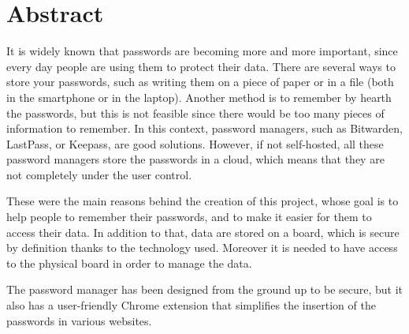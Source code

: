 \chapter*{Abstract}

It is widely known that passwords are becoming more and more important, since every day people are using them to protect their data. There are several ways to store your passwords, such as writing them on a piece of paper or in a file (both in the smartphone or in the laptop). Another method is to remember by hearth the passwords, but this is not feasible since there would be too many pieces of information to remember. In this context, password managers, such as Bitwarden, LastPass, or Keepass, are good solutions. However, if not self-hosted, all these password managers store the passwords in a cloud, which means that they are not completely under the user control. 

These were the main reasons behind the creation of this project, whose goal is to help people to remember their passwords, and to make it easier for them to access their data. In addition to that, data are stored on a board, which is secure by definition thanks to the technology used. Moreover it is needed to have access to the physical board in order to manage the data. 

The password manager has been designed from the ground up to be secure, but it also has a user-friendly Chrome extension that simplifies the insertion of the passwords in various websites.